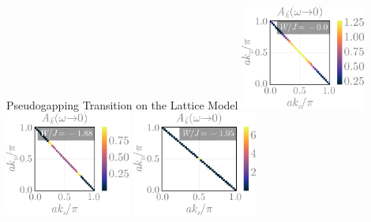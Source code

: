 \documentclass[10pt,aspectratio=169]{beamer}
\begin{document}
\begin{frame}{Pseudogapping Transition on the Lattice Model}
	\includegraphics[width=0.31\textwidth]{kspaceDOS-1.pdf}
	\includegraphics[width=0.31\textwidth]{kspaceDOS-3.pdf}
	\includegraphics[width=0.31\textwidth]{kspaceDOS-4.pdf}
\end{frame}
\end{document}
